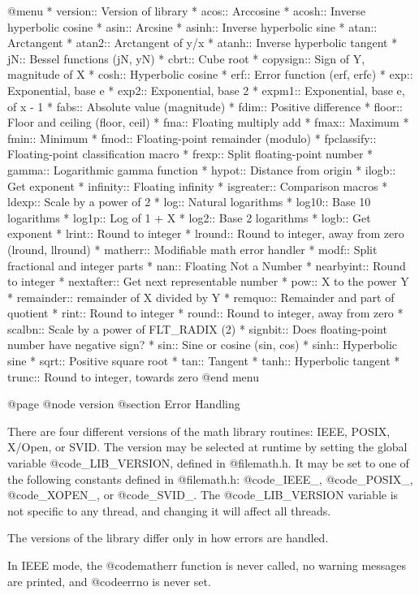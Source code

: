 @menu 
* version::	Version of library
* acos::	Arccosine
* acosh::	Inverse hyperbolic cosine
* asin::	Arcsine
* asinh::	Inverse hyperbolic sine
* atan::	Arctangent
* atan2::	Arctangent of y/x
* atanh::	Inverse hyperbolic tangent
* jN::	        Bessel functions (jN, yN)
* cbrt::	Cube root
* copysign::	Sign of Y, magnitude of X
* cosh::	Hyperbolic cosine
* erf::		Error function (erf, erfc)
* exp::		Exponential, base e
* exp2::	Exponential, base 2
* expm1::	Exponential, base e, of x - 1
* fabs::	Absolute value (magnitude)
* fdim::	Positive difference
* floor::	Floor and ceiling (floor, ceil)
* fma::		Floating multiply add
* fmax::	Maximum
* fmin::	Minimum
* fmod::	Floating-point remainder (modulo)
* fpclassify::	Floating-point classification macro
* frexp::	Split floating-point number
* gamma::	Logarithmic gamma function
* hypot::	Distance from origin
* ilogb::	Get exponent
* infinity::	Floating infinity
* isgreater::	Comparison macros
* ldexp::	Scale by a power of 2
* log::		Natural logarithms
* log10::	Base 10 logarithms
* log1p::	Log of 1 + X
* log2::	Base 2 logarithms
* logb::	Get exponent
* lrint::	Round to integer
* lround::	Round to integer, away from zero (lround, llround)
* matherr::	Modifiable math error handler
* modf::	Split fractional and integer parts
* nan::		Floating Not a Number
* nearbyint::	Round to integer
* nextafter::	Get next representable number
* pow::		X to the power Y
* remainder::	remainder of X divided by Y 
* remquo::	Remainder and part of quotient
* rint::	Round to integer
* round::	Round to integer, away from zero
* scalbn::	Scale by a power of FLT_RADIX (2)
* signbit::	Does floating-point number have negative sign?
* sin::		Sine or cosine (sin, cos)
* sinh::	Hyperbolic sine
* sqrt::	Positive square root
* tan::		Tangent
* tanh::	Hyperbolic tangent
* trunc::	Round to integer, towards zero
@end menu

@page
@node version
@section Error Handling

There are four different versions of the math library routines: IEEE,
POSIX, X/Open, or SVID.  The version may be selected at runtime by
setting the global variable @code{_LIB_VERSION}, defined in
@file{math.h}.  It may be set to one of the following constants defined
in @file{math.h}: @code{_IEEE_}, @code{_POSIX_}, @code{_XOPEN_}, or
@code{_SVID_}.  The @code{_LIB_VERSION} variable is not specific to any
thread, and changing it will affect all threads.

The versions of the library differ only in how errors are handled.

In IEEE mode, the @code{matherr} function is never called, no warning
messages are printed, and @code{errno} is never set.

